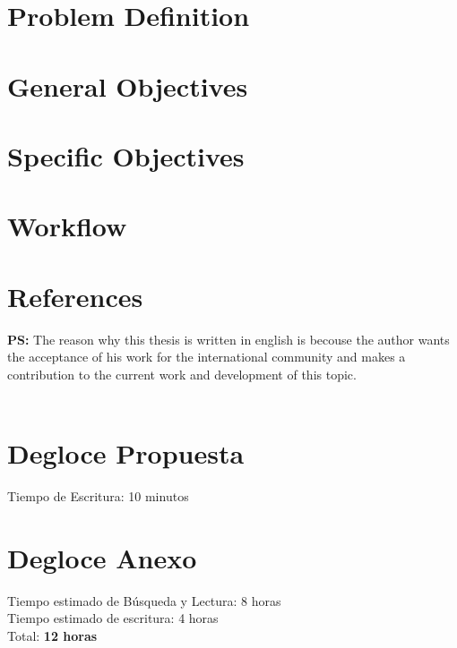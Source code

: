 \documentclass[letter, 11pt]{article}
\begin{document}


\newpage

\section{Problem Definition}

\section{General Objectives }

\section{Specific Objectives}

\section{Workflow}

\section{References}

\newpage
\textbf{PS:} The reason why this thesis is written in english is becouse the author wants the acceptance of his work for the international community and makes a contribution to the current work and development of this topic.\\\\
\section*{Degloce Propuesta}
\noindent
Tiempo de Escritura: 10 minutos\\ 
\section*{Degloce Anexo}
\noindent
Tiempo estimado de B\'usqueda y Lectura: 8 horas\\
Tiempo estimado de escritura: 4 horas\\
Total: \textbf{12 horas}
\end{document}
